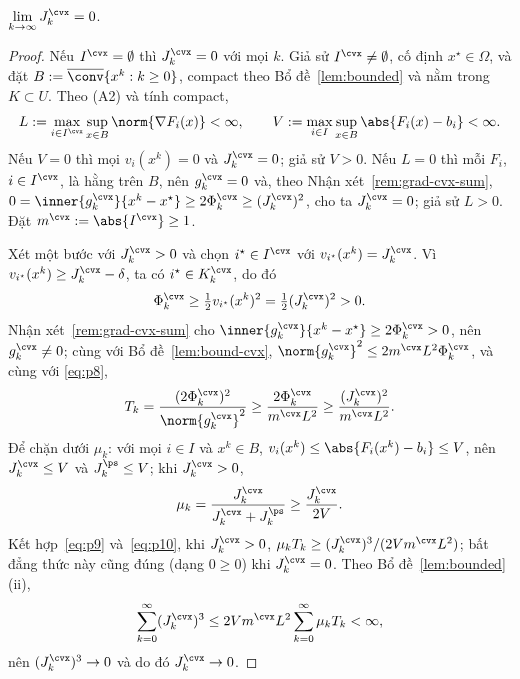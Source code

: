 \begin{lemma}\label{lem:jcvx0}
$\displaystyle\lim_{k\to\infty}J^{\cvx}_k=0$.
\end{lemma}
\begin{proof}
Nếu $I^{\cvx}=\emptyset$ thì $J^{\cvx}_k=0$ với mọi $k$. Giả sử $I^{\cvx}\ne\emptyset$, cố định
$x^\star\in\Omega$, và đặt $B:=\overline{\conv}\{x^k:k\ge0\}$, compact theo Bổ đề~\ref{lem:bounded} và nằm
trong $K\subset U$. Theo (A2) và
tính compact,
\[
L:=\max_{i\in I^{\cvx}}\sup_{x\in B}\norm{\nabla F_i(x)}<\infty,\qquad
V:=\max_{i\in I}\sup_{x\in B}\abs{F_i(x)-b_i}<\infty.
\]
Nếu $V=0$ thì mọi $v_i(x^k)=0$ và
$J^{\cvx}_k=0$; giả sử $V>0$. Nếu $L=0$ thì mỗi $F_i$, $i\in I^{\cvx}$, là hằng trên
$B$, nên $g^{\cvx}_k=0$ và, theo Nhận xét~\ref{rem:grad-cvx-sum},
$0=\inner{g^{\cvx}_k}{x^k-x^\star}\ge 2\Phi^{\cvx}_k\ge(J^{\cvx}_k)^2$, cho ta
$J^{\cvx}_k=0$; giả sử $L>0$. Đặt $m^{\cvx}:=\abs{I^{\cvx}}\ge1$.

Xét một bước với $J^{\cvx}_k>0$ và chọn $i^\star\in I^{\cvx}$ với
$v_{i^\star}(x^k)=J^{\cvx}_k$. Vì $v_{i^\star}(x^k)\ge J^{\cvx}_k-\delta$, ta có
$i^\star\in K^{\cvx}_k$, do đó
\begin{equation}\label{eq:p8}
\Phi^{\cvx}_k\ge\tfrac12 v_{i^\star}(x^k)^2=\tfrac12(J^{\cvx}_k)^2>0 .
\end{equation}
Nhận xét~\ref{rem:grad-cvx-sum} cho
$\inner{g^{\cvx}_k}{x^k-x^\star}\ge2\Phi^{\cvx}_k>0$, nên $g^{\cvx}_k\ne0$; cùng với
Bổ đề~\ref{lem:bound-cvx}, $\norm{g^{\cvx}_k}^2\le2m^{\cvx}L^2\Phi^{\cvx}_k$, và cùng với
\eqref{eq:p8},
\begin{equation}\label{eq:p9}
T_k=\frac{(2\Phi^{\cvx}_k)^2}{\norm{g^{\cvx}_k}^2}\ge\frac{2\Phi^{\cvx}_k}{m^{\cvx}L^2}\ge\frac{(J^{\cvx}_k)^2}{m^{\cvx}L^2}.
\end{equation}
Để chặn dưới $\mu_k$: với mọi $i\in I$ và $x^k\in B$,
$v_i(x^k)\le\abs{F_i(x^k)-b_i}\le V$, nên $J^{\cvx}_k\le V$ và $J^{\ps}_k\le V$; khi
$J^{\cvx}_k>0$,
\begin{equation}\label{eq:p10}
\mu_k=\frac{J^{\cvx}_k}{J^{\cvx}_k+J^{\ps}_k}\ge\frac{J^{\cvx}_k}{2V}.
\end{equation}
Kết hợp~\eqref{eq:p9} và~\eqref{eq:p10}, khi $J^{\cvx}_k>0$,
$\mu_k T_k\ge(J^{\cvx}_k)^3/(2Vm^{\cvx}L^2)$; bất đẳng thức này cũng đúng (dạng $0\ge0$) khi
$J^{\cvx}_k=0$. Theo Bổ đề~\ref{lem:bounded}(ii),
\begin{equation}\label{eq:p12}
\sum_{k=0}^\infty(J^{\cvx}_k)^3\le 2Vm^{\cvx}L^2\sum_{k=0}^\infty\mu_k T_k<\infty,
\end{equation}
nên $(J^{\cvx}_k)^3\to0$ và do đó $J^{\cvx}_k\to0$.
\end{proof}

